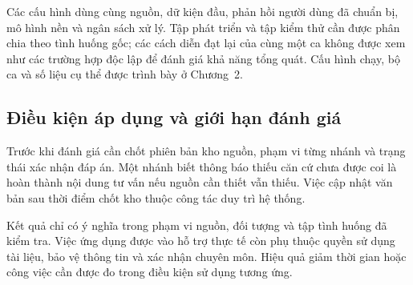 Các cấu hình dùng cùng nguồn, dữ kiện đầu, phản hồi người dùng đã chuẩn bị,
mô hình nền và ngân sách xử lý. Tập phát triển và tập kiểm thử cần được
phân chia theo tình huống gốc; các cách diễn đạt lại của cùng một ca không
được xem như các trường hợp độc lập để đánh giá khả năng tổng quát. Cấu
hình chạy, bộ ca và số liệu cụ thể được trình bày ở Chương~2.

\subsection{Điều kiện áp dụng và giới hạn đánh giá}
Trước khi đánh giá cần chốt phiên bản kho nguồn, phạm vi từng nhánh và trạng
thái xác nhận đáp án. Một nhánh biết thông báo thiếu căn cứ chưa được coi
là hoàn thành nội dung tư vấn nếu nguồn cần thiết vẫn thiếu. Việc cập nhật
văn bản sau thời điểm chốt kho thuộc công tác duy trì hệ thống.

Kết quả chỉ có ý nghĩa trong phạm vi nguồn, đối tượng và tập tình huống đã
kiểm tra. Việc ứng dụng được vào hỗ trợ thực tế còn phụ thuộc quyền sử dụng
tài liệu, bảo vệ thông tin và xác nhận chuyên môn. Hiệu quả giảm thời gian
hoặc công việc cần được đo trong điều kiện sử dụng tương ứng.
